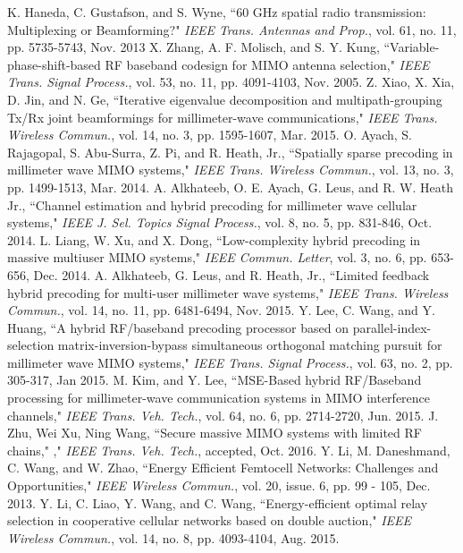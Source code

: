 \documentclass[11pt,draftcls,onecolumn]{IEEEtran}
\begin{document}
\begin{small}
\begin{thebibliography}{30}
K. Haneda, C. Gustafson, and S. Wyne, ``60 GHz spatial radio transmission: Multiplexing or Beamforming?" \emph{IEEE Trans. Antennas and Prop.}, vol. 61, no. 11, pp. 5735-5743, Nov. 2013
X. Zhang, A. F. Molisch, and S. Y. Kung, ``Variable-phase-shift-based RF baseband codesign for MIMO antenna selection," \emph{IEEE Trans. Signal Process.}, vol. 53, no. 11, pp. 4091-4103, Nov. 2005.
Z. Xiao, X. Xia, D. Jin, and N. Ge, ``Iterative eigenvalue decomposition and multipath-grouping Tx/Rx joint beamformings for millimeter-wave communications," \emph{IEEE Trans. Wireless Commun.}, vol. 14, no. 3, pp. 1595-1607, Mar. 2015.
O. Ayach, S. Rajagopal, S. Abu-Surra, Z. Pi, and R. Heath, Jr., ``Spatially sparse precoding in millimeter wave MIMO systems," \emph{IEEE Trans. Wireless Commun.}, vol. 13, no. 3, pp. 1499-1513, Mar. 2014.
A. Alkhateeb, O. E. Ayach, G. Leus, and R. W. Heath Jr., ``Channel estimation and hybrid precoding for millimeter wave cellular systems," \emph{IEEE J. Sel. Topics Signal Process.}, vol. 8, no. 5, pp. 831-846, Oct. 2014.
L. Liang, W. Xu, and X. Dong, ``Low-complexity hybrid precoding in massive multiuser MIMO systems," \emph{IEEE Commun. Letter}, vol. 3, no. 6, pp. 653-656, Dec. 2014.
A. Alkhateeb, G. Leus, and R. Heath, Jr., ``Limited feedback hybrid precoding for multi-user millimeter wave systems," \emph{IEEE Trans. Wireless Commun.}, vol. 14, no. 11, pp. 6481-6494, Nov. 2015.
Y. Lee, C. Wang, and Y. Huang, ``A hybrid RF/baseband precoding processor based on parallel-index-selection matrix-inversion-bypass simultaneous orthogonal matching pursuit for millimeter wave MIMO systems," \emph{IEEE Trans. Signal Process.}, vol. 63, no. 2, pp. 305-317, Jan 2015.
M. Kim, and Y. Lee, ``MSE-Based hybrid RF/Baseband processing for millimeter-wave communication systems in MIMO interference channels," \emph{IEEE Trans. Veh. Tech.}, vol. 64, no. 6, pp. 2714-2720, Jun. 2015.
J. Zhu, Wei Xu, Ning Wang, ``Secure massive MIMO systems with limited RF chains," ," \emph{IEEE Trans. Veh. Tech.}, accepted, Oct. 2016.
Y. Li, M. Daneshmand, C. Wang, and W. Zhao, ``Energy Efficient Femtocell Networks: Challenges and Opportunities," \emph{IEEE Wireless Commun.}, vol. 20, issue. 6, pp. 99 - 105, Dec. 2013.
Y. Li, C. Liao, Y. Wang, and C. Wang, ``Energy-efficient optimal relay selection in cooperative cellular networks based on double auction," \emph{IEEE Wireless Commun.}, vol. 14, no. 8,  pp. 4093-4104, Aug. 2015.

\end{thebibliography}
\end{small}
\end{document}
